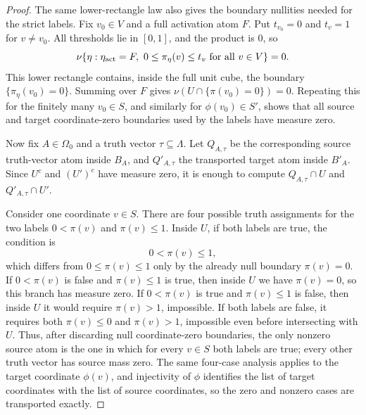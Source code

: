 \begin{proof}
The same lower-rectangle law also gives the boundary nullities needed for the
strict labels.  Fix \(v_0\in V\) and a full activation atom \(F\).  Put
\(t_{v_0}=0\) and \(t_v=1\) for \(v\ne v_0\).  All thresholds lie in
\([0,1]\), and the product is \(0\), so
\[
 \nu\{\eta:\eta_{\rm act}=F,\ 0\le\pi_\eta(v)\le t_v
       \text{ for all }v\in V\}=0.
\]
This lower rectangle contains, inside the full unit cube, the boundary
\(\{\pi_\eta(v_0)=0\}\).  Summing over \(F\) gives
\(\nu(U\cap\{\pi(v_0)=0\})=0\).  Repeating this for the finitely many
\(v_0\in S\), and similarly for \(\phi(v_0)\in S'\), shows that all source
and target coordinate-zero boundaries used by the labels have measure zero.

Now fix \(A\in\Omega_0\) and a truth vector
\(\tau\subseteq\Lambda\).  Let \(Q_{A,\tau}\) be the corresponding source
truth-vector atom inside \(B_A\), and \(Q'_{A,\tau}\) the transported target
atom inside \(B'_A\).  Since \(U^c\) and \((U')^c\) have measure zero, it is
enough to compute \(Q_{A,\tau}\cap U\) and \(Q'_{A,\tau}\cap U'\).

Consider one coordinate \(v\in S\).  There are four possible truth
assignments for the two labels \(0<\pi(v)\) and \(\pi(v)\le1\).
Inside \(U\), if both labels are true, the condition is
\[
  0<\pi(v)\le1,
\]
which differs from \(0\le\pi(v)\le1\) only by the already null boundary
\(\pi(v)=0\).  If \(0<\pi(v)\) is false and \(\pi(v)\le1\) is true, then
inside \(U\) we have \(\pi(v)=0\), so this branch has measure zero.  If
\(0<\pi(v)\) is true and \(\pi(v)\le1\) is false, then inside \(U\) it would
require \(\pi(v)>1\), impossible.  If both labels are false, it requires both
\(\pi(v)\le0\) and \(\pi(v)>1\), impossible even before intersecting with
\(U\).  Thus, after discarding null coordinate-zero boundaries, the only
nonzero source atom is the one in which for every \(v\in S\) both labels are
true; every other truth vector has source mass zero.  The same four-case
analysis applies to the target coordinate \(\phi(v)\), and injectivity of
\(\phi\) identifies the list of target coordinates with the list of source
coordinates, so the zero and nonzero cases are transported exactly.


\end{proof}
